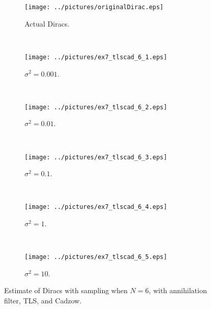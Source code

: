 \documentclass[11pt,a4paper]{report}
\begin{document}
\begin{figure}[H]
    \captionsetup[subfigure]{position=b}
    \centering
    \begin{subfigure}{0.49\textwidth}
        \texttt{[image: ../pictures/originalDirac.eps]}
        \caption{Actual Diracs.}
        \label{fig:ex7_tlscad_6_0}
    \end{subfigure}
    ~
    \begin{subfigure}{0.49\textwidth}
        \texttt{[image: ../pictures/ex7\_tlscad\_6\_1.eps]}
        \caption{$\sigma^2 = 0.001$.}
        \label{fig:ex7_tlscad_6_1}
    \end{subfigure}
    \\
    \begin{subfigure}{0.49\textwidth}
        \texttt{[image: ../pictures/ex7\_tlscad\_6\_2.eps]}
        \caption{$\sigma^2 = 0.01$.}
        \label{fig:ex7_tlscad_6_2}
    \end{subfigure}
    ~
    \begin{subfigure}{0.49\textwidth}
        \texttt{[image: ../pictures/ex7\_tlscad\_6\_3.eps]}
        \caption{$\sigma^2 = 0.1$.}
        \label{fig:ex7_tlscad_6_3}
    \end{subfigure}
    \\
    \begin{subfigure}{0.49\textwidth}
        \texttt{[image: ../pictures/ex7\_tlscad\_6\_4.eps]}
        \caption{$\sigma^2 = 1$.}
        \label{fig:ex7_tlscad_6_4}
    \end{subfigure}
    ~
    \begin{subfigure}{0.49\textwidth}
        \texttt{[image: ../pictures/ex7\_tlscad\_6\_5.eps]}
        \caption{$\sigma^2 = 10$.}
        \label{fig:ex7_tlscad_6_5}
    \end{subfigure}

    \caption{Estimate of Diracs with sampling when $N = 6$, with annihilation filter, TLS, and Cadzow.}
    \label{fig:ex7_tlscad_6}
\end{figure}
\end{document}
